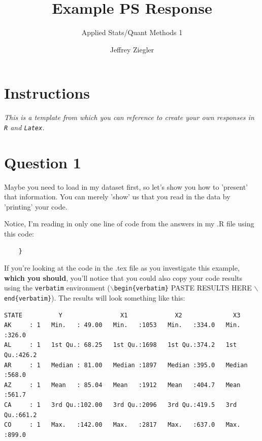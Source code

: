 \documentclass[12pt,letterpaper]{article}
\title{Example PS Response}
\date{Jeffrey Ziegler}
\author{Applied Stats/Quant Methods 1}
\begin{document}
	\maketitle
	
	\section*{Instructions}

 \textit{This is a template from which you can reference to create your own responses in \texttt{R} and \texttt{Latex}.}

\section*{Question 1 }

\noindent Maybe you need to load in my dataset first, so let's show you how to 'present' that information. You can merely 'show' us that you read in the data by 'printing' your code. \\

  

\vspace{.25cm}

\noindent Notice, I'm reading in only one line of code from the answers in my .R file using this code: 

\begin{verbatim}
	}
\end{verbatim}

\noindent If you're looking at the code in the .tex file as you investigate this example, \textbf{which you should}, you'll notice that you could also copy your code results using the \texttt{verbatim} environment (\texttt{$\backslash$begin\{verbatim\}} PASTE RESULTS HERE \texttt{$\backslash$end\{verbatim\}}). The results will look something like this:


\begin{verbatim}
STATE          Y                X1             X2              X3       
AK     : 1   Min.   : 49.00   Min.   :1053   Min.   :334.0   Min.   :326.0  
AL     : 1   1st Qu.: 68.25   1st Qu.:1698   1st Qu.:374.2   1st Qu.:426.2  
AR     : 1   Median : 81.00   Median :1897   Median :395.0   Median :568.0  
AZ     : 1   Mean   : 85.04   Mean   :1912   Mean   :404.7   Mean   :561.7  
CA     : 1   3rd Qu.:102.00   3rd Qu.:2096   3rd Qu.:419.5   3rd Qu.:661.2  
CO     : 1   Max.   :142.00   Max.   :2817   Max.   :637.0   Max.   :899.0  
\end{verbatim}
\vspace{.5cm}
\end{document}
